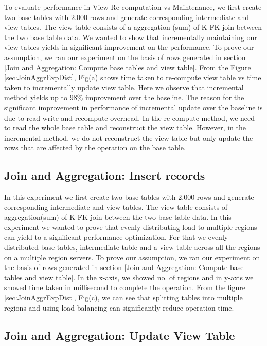 \documentclass[11pt,a4paper,bibtotoc,idxtotoc,headsepline,footsepline,footexclude,BCOR12mm,DIV13]{scrbook}
\begin{document}
To evaluate performance in View Re-computation vs Maintenance, we first create two base tables with 2.000 rows and generate corresponding intermediate and view tables. The view table consists of a aggregation (sum) of K-FK join between the two base table data. We wanted to show that incrementally maintaining our view tables yields in significant improvement on the performance. To prove our assumption, we ran our experiment on the basis of rows generated in section \ref{Join and Aggregation: Compute base tables and view table}. From the Figure \ref{sec:JoinAggrExpDist}, Fig(a) shows time taken to re-compute view table vs time taken to incrementally update view table. Here we observe that incremental method yields up to 98\% improvement over the baseline. The reason for the significant improvement in performance of incremental update over the baseline is due to read-write and recompute overhead. In the re-compute method, we need to read the whole base table and
reconstruct the view table. However, in the incremental method, we do not reconstruct the view table but only update the rows that are affected by the operation on the base table. 


\subsection{Join and Aggregation: Insert records}
\label{Join and Aggregation: Insert Records Distributed}
In this experiment we first create two base tables with 2.000 rows and generate corresponding intermediate and view tables. The view table consists of aggregation(sum) of K-FK join between the two base table data. In this experiment we wanted to prove that evenly distributing load to multiple regions can yield to a significant performance optimization. For that we evenly distributed base tables, intermediate table and a view table across all the regions on a multiple region servers.  
To prove our assumption, we ran our experiment on the basis of rows generated in section \ref{Join and Aggregation: Compute base tables and view table}. In the x-axis, we showed no. of regions and in y-axis we showed time taken in millisecond to complete the operation. From the figure \ref{sec:JoinAggrExpDist}, Fig(c), we can see that splitting tables into multiple regions and using load balancing can significantly reduce operation time.

\subsection{Join and Aggregation: Update View Table} 
\label{Join and Aggr: Update View Table Distributed}
\end{document}
